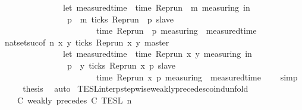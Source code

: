 \begin{isabellebody}
\ \ \ \ \ \ \ \ \ \ \ \ \ \ \ {\isacharparenleft}let\ measured{\isacharunderscore}time\ {\isacharequal}\ time\ {\isacharparenleft}{\isacharparenleft}Rep{\isacharunderscore}run\ {\isasymrho}{\isacharparenright}\ m\ measuring{\isacharparenright}\ in\isanewline
\ \ \ \ \ \ \ \ \ \ \ \ \ \ \ \ {\isasymexists}p\ {\isasymge}\ m{\isachardot}\ ticks\ {\isacharparenleft}{\isacharparenleft}Rep{\isacharunderscore}run\ {\isasymrho}{\isacharparenright}\ p\ slave{\isacharparenright}\isanewline
\ \ \ \ \ \ \ \ \ \ \ \ \ \ \ \ \ \ \ \ \ \ {\isasymand}\ time\ {\isacharparenleft}{\isacharparenleft}Rep{\isacharunderscore}run\ {\isasymrho}{\isacharparenright}\ p\ measuring{\isacharparenright}\ {\isacharequal}\ measured{\isacharunderscore}time\ {\isacharplus}\ {\isasymdelta}{\isasymtau}{\isacharparenright}{\isacharbraceright}{\isacartoucheclose}\isanewline
\ \ \isamarkupfalse%
\ nat{\isacharunderscore}set{\isacharunderscore}suc{\isacharbrackleft}of\ {\isacartoucheopen}n{\isacartoucheclose}\ {\isacartoucheopen}{\isasymlambda}x\ y{\isachardot}\ ticks\ {\isacharparenleft}{\isacharparenleft}Rep{\isacharunderscore}run\ x{\isacharparenright}\ y\ master{\isacharparenright}\ {\isasymlongrightarrow}\isanewline
\ \ \ \ \ \ \ \ \ \ \ \ \ \ \ {\isacharparenleft}let\ measured{\isacharunderscore}time\ {\isacharequal}\ time\ {\isacharparenleft}{\isacharparenleft}Rep{\isacharunderscore}run\ x{\isacharparenright}\ y\ measuring{\isacharparenright}\ in\isanewline
\ \ \ \ \ \ \ \ \ \ \ \ \ \ \ \ {\isasymexists}p\ {\isasymge}\ y{\isachardot}\ ticks\ {\isacharparenleft}{\isacharparenleft}Rep{\isacharunderscore}run\ x{\isacharparenright}\ p\ slave{\isacharparenright}\isanewline
\ \ \ \ \ \ \ \ \ \ \ \ \ \ \ \ \ \ \ \ \ \ {\isasymand}\ time\ {\isacharparenleft}{\isacharparenleft}Rep{\isacharunderscore}run\ x{\isacharparenright}\ p\ measuring{\isacharparenright}\ {\isacharequal}\ measured{\isacharunderscore}time\ {\isacharplus}\ {\isasymdelta}{\isasymtau}{\isacharparenright}{\isacartoucheclose}{\isacharbrackright}\ \isamarkupfalse%
\ simp\isanewline
\ \ \isamarkupfalse%
\ \isamarkupfalse%
\ {\isacharquery}thesis\ \isamarkupfalse%
\ auto\isanewline
{}\isamarkupfalse%
%
\endisatagproof
{\isafoldproof}%
%
\isadelimproof
\isanewline
%
\endisadelimproof
\isanewline
{}\isamarkupfalse%
\ TESL{\isacharunderscore}interp{\isacharunderscore}stepwise{\isacharunderscore}weakly{\isacharunderscore}precedes{\isacharunderscore}coind{\isacharunderscore}unfold{\isacharcolon}\isanewline
\ \ \ {\isacartoucheopen}{\isasymlbrakk}\ C\ weakly\ precedes\ C\ {\isasymrbrakk}\isactrlsub T\isactrlsub E\isactrlsub S\isactrlsub L\isactrlbsup {\isasymge}\ n\isactrlesup \ {\isacharequal}\ \ \ \ \ \ \ \ \ \ \ \ \ \ \ \ \ %

\end{isabellebody}
